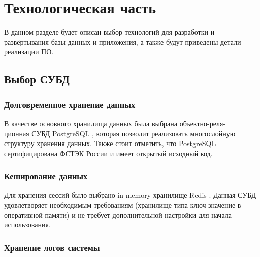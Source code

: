 \section{Технологическая часть}

В данном разделе будет описан выбор технологий для разработки и развёртывания базы данных и приложения, а также будут приведены детали реализации ПО.

\subsection{Выбор СУБД}


\subsubsection{Долговременное хранение данных}

В качестве основного хранилища данных была выбрана объектно-реля-\\ционная СУБД PostgreSQL \cite{PostgreSQL}, которая позволит реализовать многослойную структуру хранения данных. Также стоит отметить, что PostgreSQL сертифицирована ФСТЭК России \cite{fstec} и имеет открытый исходный код.


\subsubsection{Кеширование данных}

Для хранения сессий было выбрано in-memory хранилище Redis \cite{Redis}. Данная СУБД удовлетворяет необходимым требованиям (хранилище типа ключ-значение в оперативной памяти) и не требует дополнительной настройки для начала использования.

\subsubsection{Хранение логов системы}

